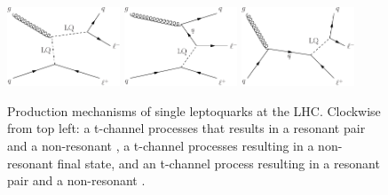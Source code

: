 \begin{figure}[H]
    \centering
    {\includegraphics[width=0.3\textwidth]{Images/Theory/SingleLQProdT1.pdf}\hspace{0.1\textwidth}}
    {\includegraphics[width=0.3\textwidth]{Images/Theory/SingleLQProdT2.pdf}\vspace{0.05\textwidth}}
    {\includegraphics[width=0.3\textwidth]{Images/Theory/SingleLQProdS1.pdf}\vspace{0.05\textwidth}}
    \caption{Production mechanisms of single leptoquarks at the LHC. Clockwise from top left: a t-channel processes that results in a resonant \HepProcess{\Pquark\Plepton} pair and a non-resonant \Plepton, a t-channel processes resulting in a non-resonant \HepProcess{\Plepton\Plepton\Pquark} final state, and an t-channel process resulting in a resonant \HepProcess{\Pquark\Plepton} pair and a non-resonant \Plepton.}
    \label{fig:LQsingleprod}
\end{figure}

